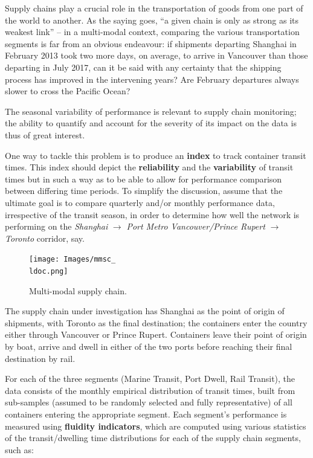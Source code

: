 \begin{Example} Supply chains play a crucial role in the transportation of goods from one part of the world to another. As the saying goes, ``a given chain is only as strong as its weakest link'' -- in a multi-modal context, comparing the various transportation segments is far from an obvious endeavour: if shipments departing Shanghai in February 2013 took two more days, on average, to arrive in Vancouver than those departing in July 2017, can it be said with any certainty that the shipping process has improved in the intervening years? Are February departures always slower to cross the Pacific Ocean? \par The seasonal variability of performance is relevant to supply chain monitoring; the ability to quantify and account for the severity of its impact on the data is thus of great interest. \par 
One way to tackle this problem is to produce an \textbf{index} to track container transit times. This index should depict the \textbf{reliability} and the \textbf{variability} of transit times but in such a way as to be able to allow for performance comparison between differing time periods.\newl 
To simplify the discussion, assume that the ultimate goal is to compare quarterly and/or monthly performance data, irrespective of the transit season, in order to determine how well the network is performing on the \textit{Shanghai} $\to$ \textit{Port Metro Vancouver/Prince Rupert} $\to$ \textit{Toronto} corridor, say. 
\begin{figure}[H]
\centering
\texttt{[image: Images/mmsc\_\\ldoc.png]}
\caption{\small Multi-modal supply chain.} \label{fig:mmsc}
\end{figure}
\noindent The supply chain under investigation has Shanghai as the point of origin of shipments, with Toronto as the final destination; the containers enter the country either through Vancouver or Prince Rupert. Containers leave their point of origin by boat, arrive and dwell in either of the two ports before reaching their final destination by rail. \par 
For each of the three segments (Marine Transit, Port Dwell, Rail Transit), the data consists of the monthly empirical distribution of transit times, built from sub-samples  (assumed to be randomly selected and fully representative) of all containers entering the appropriate segment.
\newl
Each segment's performance is measured using \textbf{fluidity indicators}, which are computed using various statistics of the transit/dwelling time distributions for each of the supply chain segments, such as: 

\end{Example}
